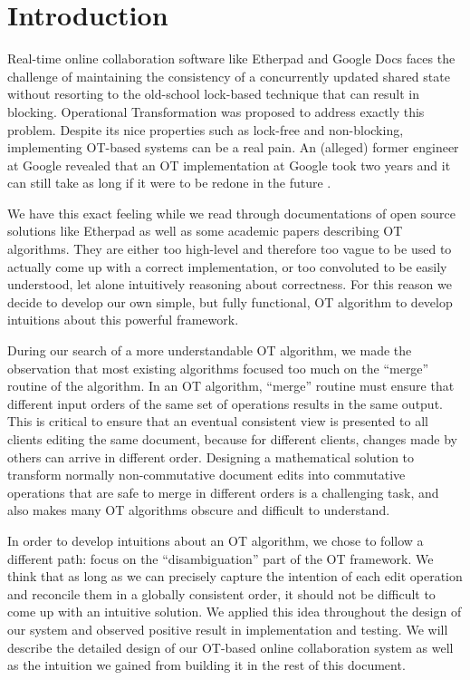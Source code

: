 \section{Introduction}

Real-time online collaboration software like Etherpad and Google Docs faces the challenge of
maintaining the consistency of a concurrently updated shared state without resorting to the
old-school lock-based technique that can result in blocking. Operational Transformation \cite{sun1998operational}
was proposed to address exactly this problem. Despite its nice properties such as lock-free and
non-blocking, implementing OT-based systems can be a real pain. An (alleged) former engineer at
Google revealed that an OT implementation at Google took two years and it can still take as long if
it were to be redone in the future \cite{sharejs}.

We have this exact feeling while we read through documentations of open source solutions like
Etherpad as well as some academic papers describing OT algorithms. They are either too high-level
and therefore too vague to be used to actually come up with a correct implementation, or too
convoluted to be easily understood, let alone intuitively reasoning about correctness. For this
reason we decide to develop our own simple, but fully functional, OT algorithm to develop intuitions
about this powerful framework.

During our search of a more understandable OT algorithm, we made the observation that most existing
algorithms focused too much on the ``merge'' routine of the algorithm. In an OT algorithm, ``merge''
routine must ensure that different input orders of the same set of operations results in the same
output. This is critical to ensure that an eventual consistent view is presented to all clients
editing the same document, because for different clients, changes made by others can arrive in
different order. Designing a mathematical solution to transform normally non-commutative document
edits into commutative operations that are safe to merge in different orders is a challenging task,
and also makes many OT algorithms obscure and difficult to understand.

In order to develop intuitions about an OT algorithm, we chose to follow a different path: focus on
the ``disambiguation'' part of the OT framework. We think that as long as we can precisely capture
the intention of each edit operation and reconcile them in a globally consistent order, it should
not be difficult to come up with an intuitive solution. We applied this idea throughout the design
of our system and observed positive result in implementation and testing. We will describe the
detailed design of our OT-based online collaboration system as well as the intuition we gained from
building it in the rest of this document.

